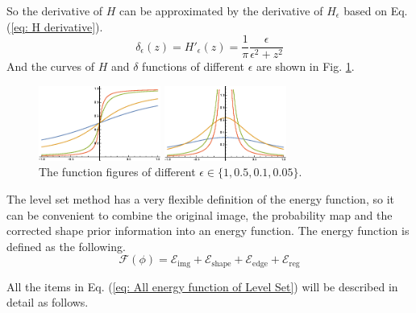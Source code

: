 So the derivative of $H$ can be approximated by the derivative of $H_\epsilon$ based on Eq. (\ref{eq: H derivative}).
\begin{equation}\label{eq: H derivative}
  \delta_\epsilon(z) = H'_\epsilon(z) = \frac{1}{\pi}\frac{\epsilon}{\epsilon^2 + z^2}
\end{equation}
And the curves of $H$ and $\delta$ functions of different $\epsilon$ are shown in Fig. \ref{fig: The function figures of different epsilon}.
\begin{figure}[h]
    \centering
    \begin{minipage}[b]{4cm}
        \centering
        \includegraphics[width=4cm]{figs/H.eps}
        \caption*{$H_\epsilon(z)$}
    \end{minipage}
    \mbox{\hspace{0.2cm}}
    \begin{minipage}[b]{4cm}
        \centering
        \includegraphics[width=4cm]{figs/delta.eps}
        \caption*{$\delta_\epsilon(z)$}
    \end{minipage}
    \caption{The function figures of different $\epsilon \in \{1, 0.5, 0.1, 0.05\}$.}
    \label{fig: The function figures of different epsilon}
\end{figure}

The level set method has a very flexible definition of the energy function, so it can be convenient to combine the original image, the probability map and the corrected shape prior information into an energy function. The energy function is defined as the following.
\begin{equation}\label{eq: All energy function of Level Set}
    \mathcal{F}(\phi) = \mathcal{E}_{\text{img}} + \mathcal{E}_{\text{shape}} + \mathcal{E}_{\text{edge}} + \mathcal{E}_{\text{reg}}
\end{equation}

All the items in Eq. (\ref{eq: All energy function of Level Set}) will be described in detail as follows.

